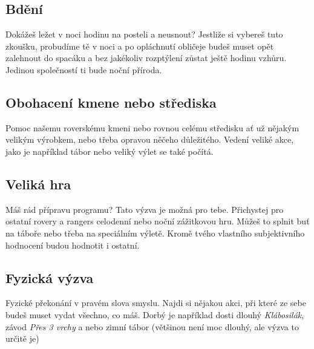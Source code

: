 \documentclass[11pt, fleqn]{article}
\begin{document}
  \subsection*{Bdění}
  Dokážeš ležet v noci hodinu na posteli a neusnout? Jestliže si vybereš tuto zkoušku, probudíme tě v noci a po opláchnutí obličeje budeš muset opět zalehnout do spacáku a bez jakékoliv rozptýlení zůstat ještě hodinu vzhůru. Jedinou společností ti bude noční příroda.
  \subsection*{Obohacení kmene nebo střediska}
  Pomoc našemu roverskému kmeni nebo rovnou celému středisku ať už nějakým velikým výrobkem, nebo třeba opravou něčeho důležitého. Vedení veliké akce, jako je například tábor nebo veliký výlet se také počítá.
  \subsection*{Veliká hra}
  Máš rád přípravu programu? Tato výzva je možná pro tebe. Přichystej pro ostatní rovery a rangers celodenní nebo noční zážitkovou hru. Můžeš to splnit buť na táboře nebo třeba na speciálním výletě. Kromě tvého vlastního subjektivního hodnocení budou hodnotit i ostatní.
  \subsection*{Fyzická výzva}
  Fyzické překonání v pravém slova smyslu. Najdi si nějakou akci, při které ze sebe budeš muset vydat všechno, co máš. Dorbý je například dosti dlouhý \textit{Klábosilák}, závod \textit{Přes 3 vrchy} a nebo zimní tábor (většinou není moc dlouhý, ale výzva to určitě je) 
\end{document}
